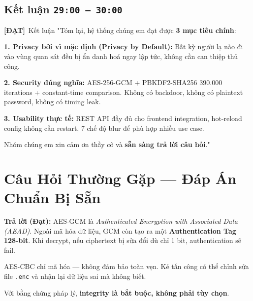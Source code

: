 \documentclass[12pt, a4paper]{article}
\newcommand{\timing}[1]{%
  \hfill\colorbox{NavyBlue!20}{\texttt{\small #1}}%
}
\newcommand{\dat}{\textcolor{BrickRed}{\textbf{[ĐẠT]}}}
\begin{document}
\subsection{Kết luận \timing{29:00 – 30:00}}

\begin{dialog}{\dat\ Kết luận}
"Tóm lại, hệ thống chúng em đạt được \textbf{3 mục tiêu chính}:

\vspace{0.5em}
\textbf{1. Privacy bởi vì mặc định (Privacy by Default):}
Bất kỳ người lạ nào đi vào vùng quan sát đều bị ẩn danh hoá ngay lập tức,
không cần can thiệp thủ công.

\vspace{0.5em}
\textbf{2. Security đúng nghĩa:}
AES-256-GCM + PBKDF2-SHA256 390.000 iterations + constant-time comparison.
Không có backdoor, không có plaintext password, không có timing leak.

\vspace{0.5em}
\textbf{3. Usability thực tế:}
REST API đầy đủ cho frontend integration,
hot-reload config không cần restart,
7 chế độ blur để phù hợp nhiều use case.

\vspace{0.5em}
Nhóm chúng em xin cảm ơn thầy cô và \textbf{sẵn sàng trả lời câu hỏi}."
\end{dialog}

\section{Câu Hỏi Thường Gặp --- Đáp Án Chuẩn Bị Sẵn}

\begin{tcolorbox}[colback=gray!5, colframe=MidnightBlue, title=\textbf{Q1: Tại sao dùng AES-GCM mà không phải AES-CBC?},
  breakable]
\textbf{Trả lời (Đạt):}
AES-GCM là \textit{Authenticated Encryption with Associated Data (AEAD)}.
Ngoài mã hóa dữ liệu, GCM còn tạo ra một \textbf{Authentication Tag 128-bit}.
Khi decrypt, nếu ciphertext bị sửa đổi dù chỉ 1 bit, authentication sẽ fail.

AES-CBC chỉ mã hóa --- không đảm bảo toàn vẹn.
Kẻ tấn công có thể chỉnh sửa file \texttt{.enc}
và nhận lại dữ liệu sai mà không biết.

Với bằng chứng pháp lý, \textbf{integrity là bắt buộc, không phải tùy chọn}.
\end{tcolorbox}
\end{document}
